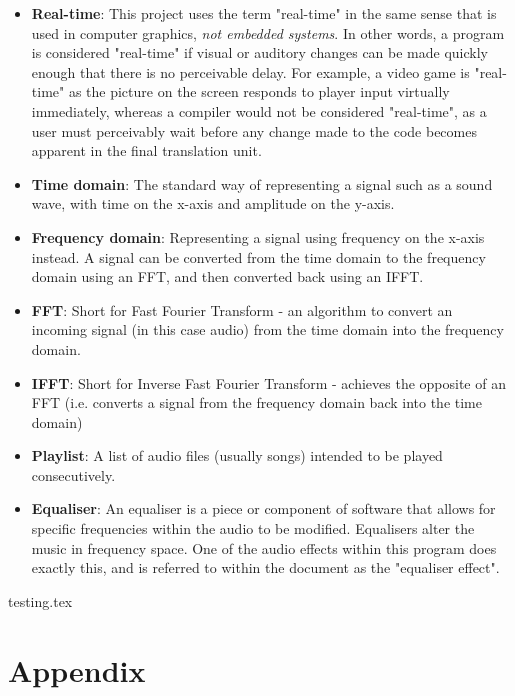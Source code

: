 \documentclass{article}
\begin{document}
	\begin{itemize}
		\item \textbf{Real-time}: This project uses the term "real-time" in the same sense that is used in computer graphics, \textit{not embedded systems}. In other words, a program is considered "real-time" if visual or auditory changes can be made quickly enough that there is no perceivable delay. For example, a video game is "real-time" as the picture on the screen responds to player input virtually immediately, whereas a compiler would not be considered "real-time", as a user must perceivably wait before any change made to the code becomes apparent in the final translation unit.
		
		\item \textbf{Time domain}: The standard way of representing a signal such as a sound wave, with time on the x-axis and amplitude on the y-axis.
		
		\item \textbf{Frequency domain}: Representing a signal using frequency on the x-axis instead. A signal can be converted from the time domain to the frequency domain using an FFT, and then converted back using an IFFT.
		
		\item \textbf{FFT}: Short for Fast Fourier Transform - an algorithm to convert an incoming signal (in this case audio) from the time domain into the frequency domain.
		
		\item \textbf{IFFT}: Short for Inverse Fast Fourier Transform - achieves the opposite of an FFT (i.e. converts a signal from the frequency domain back into the time domain)
		
		\item \textbf{Playlist}: A list of audio files (usually songs)  intended to be played consecutively.
		
		\item \textbf{Equaliser}: An equaliser is a piece or component of software that allows for specific frequencies within the audio to be modified. Equalisers alter the music in frequency space. One of the audio effects within this program does exactly this, and is referred to within the document as the "equaliser effect".
	\end{itemize}

	
	
	
	 {testing.tex}
	

	\section { Appendix  }
\end{document}
